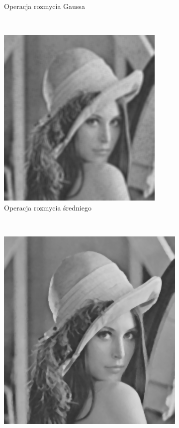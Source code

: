 \begin{figure}
\begin{subfigure}[b]{0.45\textwidth}
    \caption{Operacja rozmycia Gaussa}
    \label{fig:smooth_lena_gauss}
  \end{subfigure}
  ~
  \begin{subfigure}[b]{0.45\textwidth}
    \includegraphics[width=\textwidth]{img/smooth-lena-mean}
    \caption{Operacja rozmycia średniego}
    \label{fig:smooth_lena_gauss}
  \end{subfigure}
  ~
  \begin{subfigure}[b]{0.45\textwidth}
    \includegraphics[width=\textwidth]{img/smooth-lena-median}

\end{subfigure}
\end{figure}
